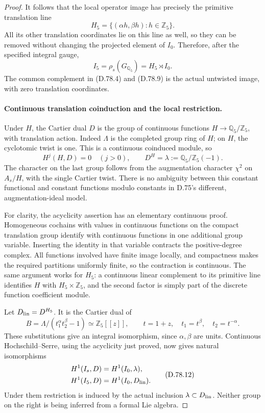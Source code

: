 \begin{proof}
It follows that the local operator image has precisely the
primitive translation line
\[
 H_5=\{(\alpha h,\beta h):h\in\mathbb Z_5\}.
 \]
All its other translation coordinates lie on this line as
well, so they can be removed without changing the projected
element of \(I_0\). Therefore, after the specified integral gauge,
\[
                  I_5=\rho_s(G_{\mathbb Q_5})
                            =H_5\rtimes I_0.            \tag{D.78.9}
\]
The common complement in (D.78.4) and (D.78.9) is the actual
untwisted image, with zero translation coordinates.

\paragraph{Continuous translation coinduction and the local restriction.}
Under \(H\), the Cartier dual \(D\) is the group of continuous
functions \(H\to\mathbb Q_5/\mathbb Z_5\), with translation
action. Indeed \(\Lambda\) is the completed group ring of
\(H\); on \(H\), the cyclotomic twist is one. This is a
continuous coinduced module, so
\[
 H^j(H,D)=0\quad(j>0),\qquad
 D^H=\lambda:=\mathbb Q_5/\mathbb Z_5(-1).               \tag{D.78.10}
\]
The character on the last group follows from the augmentation
character \(\chi^2\) on \(A_s/H\), with the single Cartier
twist. There is no ambiguity between this constant functional
and constant functions modulo constants in D.75's different,
augmentation-ideal model.

For clarity, the acyclicity assertion has an elementary
continuous proof. Homogeneous cochains with values in
continuous functions on the compact translation group identify
with continuous functions in one additional group variable.
Inserting the identity in that variable contracts the
positive-degree complex. All functions involved have finite
image locally, and compactness makes the required partitions
uniformly finite, so the contraction is continuous.
The same argument works for \(H_5\): a continuous linear
complement to its primitive line identifies \(H\) with
\(H_5\times\mathbb Z_5\), and the second factor is simply
part of the discrete function coefficient module.

Let \(D_{\rm lin}=D^{H_5}\). It is the Cartier dual of
\[
 B=\Lambda/(t_1^\alpha t_2^\beta-1)
                \simeq\mathbb Z_5[[z]],\qquad t=1+z,
 \quad t_1=t^\beta,\quad t_2=t^{-\alpha}.
                                                               \tag{D.78.11}
\]
These substitutions give an integral isomorphism, since
\(\alpha,\beta\) are units. Continuous Hochschild--Serre,
using the acyclicity just proved, now gives natural isomorphisms
\[
 \begin{split}
 H^1(I_s,D)&=H^1(I_0,\lambda),\\
 H^1(I_5,D)&=H^1(I_0,D_{\rm lin}).
 \end{split}                                               \tag{D.78.12}
\]
Under them restriction is induced by the actual inclusion
\(\lambda\subset D_{\rm lin}\). Neither group on the right
is being inferred from a formal Lie algebra.


\end{proof}
